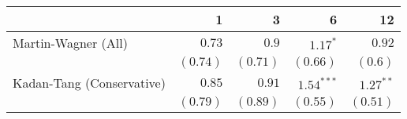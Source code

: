 \begin{tabular}{lrrrr}
\toprule
                                  &         1 &         3 &         6 &        12 \\
\midrule
Martin-Wagner (All)  & $0.73$ & $0.9$ & $1.17^{*}$ & $0.92$ \\
 & $(0.74)$ & $(0.71)$ & $(0.66)$ & $(0.6)$ \\
Kadan-Tang (Conservative)  & $0.85$ & $0.91$ & $1.54^{***}$ & $1.27^{**}$ \\
 & $(0.79)$ & $(0.89)$ & $(0.55)$ & $(0.51)$ \\
\bottomrule
\end{tabular}
\\
